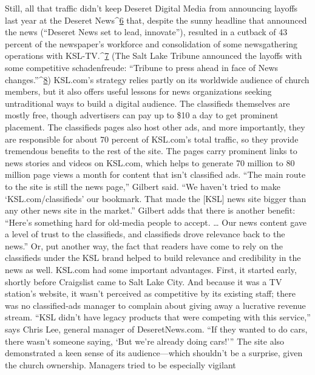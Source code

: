 Still, all that traffic didn’t keep Deseret Digital Media from announcing layoffs
last year at the Deseret News^{\href{#endnotes-ch8}{6}} that, despite the sunny headline that announced
the news (``Deseret News set to lead, innovate''), resulted in a cutback
of 43 percent of the newspaper’s workforce and consolidation of some newsgathering
operations with KSL-TV.^{\href{#endnotes-ch8}{7}} (The Salt Lake Tribune announced the
layoffs with some competitive schadenfreude: ``Tribune to press ahead in face
of News changes.''^{\href{#endnotes-ch8}{8}})
KSL.com’s strategy relies partly on its worldwide audience of church members,
but it also offers useful lessons for news organizations seeking untraditional ways
to build a digital audience.
The classifieds themselves are mostly free, though advertisers can pay up to \$10
a day to get prominent placement. The classifieds pages also host other ads, and
more importantly, they are responsible for about 70 percent of KSL.com’s total
traffic, so they provide tremendous benefits to the rest of the site. The pages carry
prominent links to news stories and videos on KSL.com, which helps to generate
70 million to 80 million page views a month for content that isn’t classified
ads. ``The main route to the site is still the news page,'' Gilbert said. ``We haven’t
tried to make ‘KSL.com/classifieds’ our bookmark. That made the [KSL] news
site bigger than any other news site in the market.''
Gilbert adds that there is another benefit: ``Here’s something hard for old-media
people to accept. … Our news content gave a level of trust to the classifieds,
and classifieds drove relevance back to the news.'' Or, put another way, the fact
that readers have come to rely on the classifieds under the KSL brand helped to
build relevance and credibility in the news as well.
KSL.com had some important advantages. First, it started early, shortly before
Craigslist came to Salt Lake City. And because it was a TV station’s website, it
wasn’t perceived as competitive by its existing staff; there was no classified-ads
manager to complain about giving away a lucrative revenue stream. ``KSL didn’t
have legacy products that were competing with this service,'' says Chris Lee,
general manager of DeseretNews.com. ``If they wanted to do cars, there wasn’t
someone saying, ‘But we’re already doing cars!’''
The site also demonstrated a keen sense of its audience—which shouldn’t be
a surprise, given the church ownership. Managers tried to be especially vigilant
